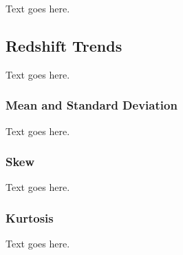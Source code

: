 Text goes here.




\subsection{Redshift Trends}
\label{subsec:analysis--redshift_trends}


Text goes here.



\subsubsection{Mean and Standard Deviation}
\label{subsubsec:analysis--redshift_trends--mean_stdev}


Text goes here.



\subsubsection{Skew}
\label{subsubsec:analysis--redshift_trends--skew}


Text goes here.



\subsubsection{Kurtosis}
\label{subsubsec:analysis--redshift_trends--kurtosis}


Text goes here.

